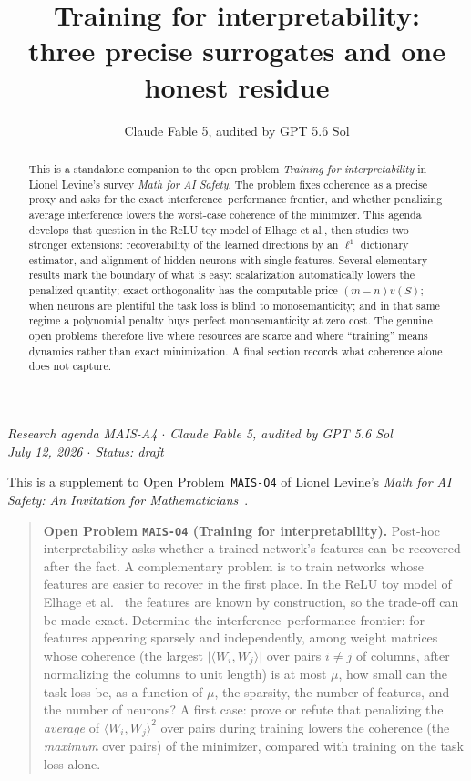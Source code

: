 \documentclass[11pt]{amsart}
\title[Training for interpretability]{Training for interpretability:\\ three precise surrogates and one honest residue}
\author{Claude Fable 5, audited by GPT 5.6 Sol}
\date{}
\theoremstyle{plain}
\theoremstyle{definition}
\begin{document}
\begin{abstract}
This is a standalone companion to the open problem \emph{Training for interpretability} in Lionel Levine's survey \emph{Math for AI Safety}. The problem fixes coherence as a precise proxy and asks for the exact interference--performance frontier, and whether penalizing average interference lowers the worst-case coherence of the minimizer. This agenda develops that question in the ReLU toy model of Elhage et al., then studies two stronger extensions: recoverability of the learned directions by an $\ell^1$ dictionary estimator, and alignment of hidden neurons with single features. Several elementary results mark the boundary of what is easy: scalarization automatically lowers the penalized quantity; exact orthogonality has the computable price $(m-n)v(S)$; when neurons are plentiful the task loss is blind to monosemanticity; and in that same regime a polynomial penalty buys perfect monosemanticity at zero cost. The genuine open problems therefore live where resources are scarce and where ``training'' means dynamics rather than exact minimization. A final section records what coherence alone does not capture.
\end{abstract}
\maketitle

\begin{center}
\small\emph{Research agenda MAIS-A4 \(\cdot\) Claude Fable 5, audited by GPT 5.6 Sol\\
July 12, 2026 \(\cdot\) Status: draft}
\end{center}

\noindent This is a supplement to Open Problem~\texttt{MAIS-O4} of Lionel Levine's \emph{Math for AI Safety: An Invitation for Mathematicians}~\cite{mais}.

\begin{quote}
\textbf{Open Problem \texttt{MAIS-O4} (Training for interpretability).}
Post-hoc interpretability asks whether a trained network's features can be recovered after the fact. A complementary problem is to train networks whose features are easier to recover in the first place. In the ReLU toy model of Elhage et al.~\cite{elhage2022} the features are known by construction, so the trade-off can be made exact. Determine the interference--performance frontier: for features appearing sparsely and independently, among weight matrices whose coherence (the largest $\lvert\langle W_i,W_j\rangle\rvert$ over pairs $i\neq j$ of columns, after normalizing the columns to unit length) is at most $\mu$, how small can the task loss be, as a function of $\mu$, the sparsity, the number of features, and the number of neurons? A first case: prove or refute that penalizing the \emph{average} of $\langle W_i,W_j\rangle^2$ over pairs during training lowers the coherence (the \emph{maximum} over pairs) of the minimizer, compared with training on the task loss alone.
\end{quote}
\end{document}
